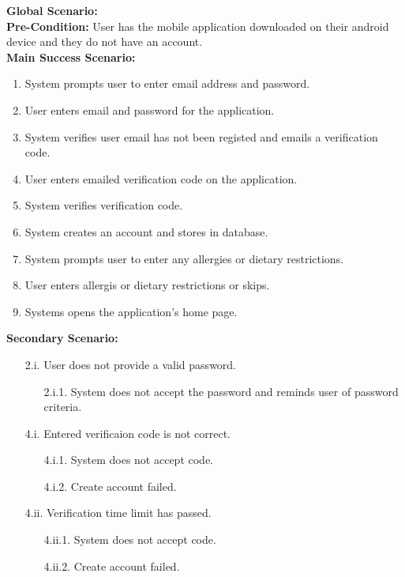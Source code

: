 \documentclass[]{article}
\begin{document}
\begin{enumerate}[{\bf BE1.}]
		{\bf Global Scenario:} \\
		\textbf{Pre-Condition:} User has the mobile application downloaded on their android device and they do not have an account. \\
		\textbf{Main Success Scenario:} 
		\begin{enumerate}[{1.}]
			\item System prompts user to enter email address and password.
			\item User enters email and password for the application.
			\item System verifies user email has not been registed and emails a verification code.
			\item User enters emailed verification code on the application.
			\item System verifies verification code.
			\item System creates an account and stores in database.
			\item System prompts user to enter any allergies or dietary restrictions.
			\item User enters allergis or dietary restrictions or skips.
			\item Systems opens the application's home page.
		\end{enumerate}
		\textbf{Secondary Scenario:}
		\begin{enumerate}
			\item[2.i.] User does not provide a valid password.
			\begin{enumerate}
				\item[2.i.1.] System does not accept the password and reminds user of password criteria.
			\end{enumerate}
		\end{enumerate}
		\begin{enumerate}
			\item[4.i.] Entered verificaion code is not correct.
			\begin{enumerate}
				\item[4.i.1.] System does not accept code.
				\item[4.i.2.] Create account failed.
			\end{enumerate}
			\item[4.ii.] Verification time limit has passed.
			\begin{enumerate}
				\item[4.ii.1.] System does not accept code.
				\item[4.ii.2.] Create account failed.
			\end{enumerate}
		\end{enumerate}


\end{enumerate}
\end{document}
